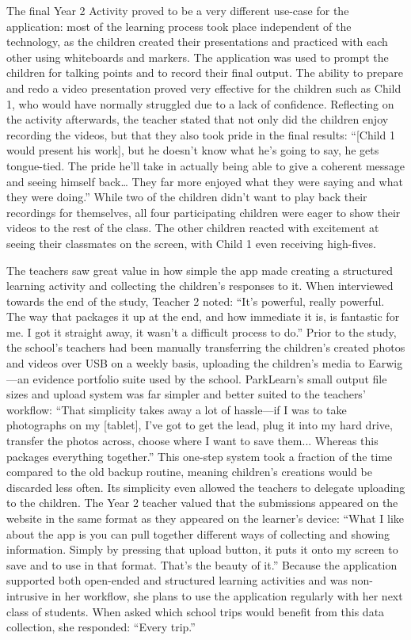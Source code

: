 The final Year 2 Activity proved to be a very different use-case for the
application: most of the learning process took place independent of the
technology, as the children created their presentations and practiced with each
other using whiteboards and markers. The application was used to prompt the
children for talking points and to record their final output. The ability to
prepare and redo a video presentation proved very effective for the children
such as Child 1, who would have normally struggled due to a lack of confidence.
Reflecting on the activity afterwards, the teacher stated that not only did the
children enjoy recording the videos, but that they also took pride in the final
results: “[Child 1 would present his work], but he doesn’t know what he’s going
to say, he gets tongue-tied. The pride he’ll take in actually being able to give
a coherent message and seeing himself back… They far more enjoyed what they were
saying and what they were doing.” While two of the children didn’t want to play
back their recordings for themselves, all four participating children were eager
to show their videos to the rest of the class. The other children reacted with
excitement at seeing their classmates on the screen, with Child 1 even receiving
high-fives. 

The teachers saw great value in how simple the app made creating a structured
learning activity and collecting the children’s responses to it. When
interviewed towards the end of the study, Teacher 2 noted: “It’s powerful,
really powerful. The way that packages it up at the end, and how immediate it
is, is fantastic for me. I got it straight away, it wasn’t a difficult process
to do.” Prior to the study, the school’s teachers had been manually transferring
the children’s created photos and videos over USB on a weekly basis, uploading
the children’s media to Earwig—an evidence portfolio suite used by the school.
ParkLearn’s small output file sizes and upload system was far simpler and better
suited to the teachers’ workflow: “That simplicity takes away a lot of hassle—if
I was to take photographs on my [tablet], I’ve got to get the lead, plug it into
my hard drive, transfer the photos across, choose where I want to save them...
Whereas this packages everything together.” This one-step system took a fraction
of the time compared to the old backup routine, meaning children’s creations
would be discarded less often. Its simplicity even allowed the teachers to
delegate uploading to the children. The Year 2 teacher valued that the
submissions appeared on the website in the same format as they appeared on the
learner’s device: “What I like about the app is you can pull together different
ways of collecting and showing information. Simply by pressing that upload
button, it puts it onto my screen to save and to use in that format. That’s the
beauty of it.” Because the application supported both open-ended and structured
learning activities and was non-intrusive in her workflow, she plans to use the
application regularly with her next class of students. When asked which school
trips would benefit from this data collection, she responded: “Every trip.”

